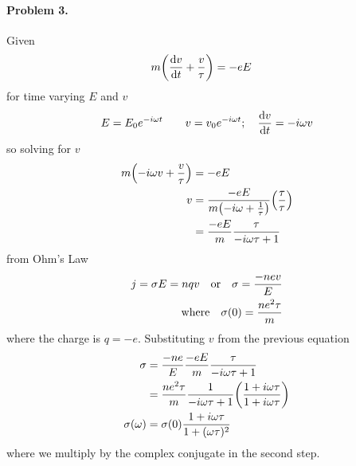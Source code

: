 \documentclass[../main.tex]{subfiles}
\begin{document}
\paragraph*{Problem 3.} Given
\begin{align*}
    m \qt(\dv{v}{t} + \frac{v}{\tau}) &= -eE
\end{align*}
for time varying $E$ and $v$
\begin{align*}
    E = E_0 e^{-i\omega t} \qquad v = v_0 e^{-i\omega t}; \quad \dv{v}{t} = -i\omega v
\end{align*}
so solving for $v$
\begin{align*}
    m \qt(-i\omega v + \frac{v}{\tau}) &= -eE \\
    v &= \frac{-eE}{m\qt(-i\omega + \frac{1}{\tau})} \qt(\frac{\tau}{\tau})\\
    &= \frac{-eE}{m} \frac{\tau}{-i\omega\tau + 1} 
\end{align*}
from Ohm's Law 
\begin{align*}
    j = \sigma E = nqv \qor \sigma = \frac{-nev}{E} \\
    \qqtext{where} \sigma(0) = \frac{ne^2\tau}{m}
\end{align*}
where the charge is $q = -e$. Substituting $v$ from the previous equation
\begin{align*}
    \sigma &= \frac{-ne}{E} \frac{-eE}{m} \frac{\tau}{-i\omega\tau + 1} \\
    &= \frac{ne^2\tau}{m} \frac{1}{-i\omega\tau + 1}
    \qt({\frac{1 + i\omega\tau}{1 + i\omega\tau}}) \\
    \sigma(\omega) &= \sigma(0) \frac{1 + i\omega\tau}{1 + (\omega\tau)^2}
\end{align*}
where we multiply by the complex conjugate in the second step. 
\end{document}
